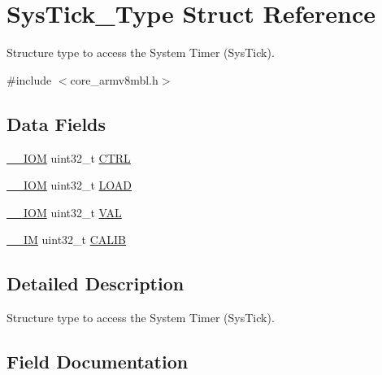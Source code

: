 \hypertarget{struct_sys_tick___type}{}\section{Sys\+Tick\+\_\+\+Type Struct Reference}
\label{struct_sys_tick___type}


Structure type to access the System Timer (Sys\+Tick).  




{\ttfamily \#include $<$core\+\_\+armv8mbl.\+h$>$}

\subsection*{Data Fields}
\begin{DoxyCompactItemize}
\item 
\mbox{\hyperlink{core__cm4_8h_ab6caba5853a60a17e8e04499b52bf691}{\+\_\+\+\_\+\+I\+OM}} uint32\+\_\+t \mbox{\hyperlink{struct_sys_tick___type_ac81efc171e9852a36caeb47122bfec5b}{C\+T\+RL}}
\item 
\mbox{\hyperlink{core__cm4_8h_ab6caba5853a60a17e8e04499b52bf691}{\+\_\+\+\_\+\+I\+OM}} uint32\+\_\+t \mbox{\hyperlink{struct_sys_tick___type_a0c1333686137b7e25a46bd548a5b5bc3}{L\+O\+AD}}
\item 
\mbox{\hyperlink{core__cm4_8h_ab6caba5853a60a17e8e04499b52bf691}{\+\_\+\+\_\+\+I\+OM}} uint32\+\_\+t \mbox{\hyperlink{struct_sys_tick___type_ae7a655a853654127f3dfb7fa32c3f457}{V\+AL}}
\item 
\mbox{\hyperlink{core__cm4_8h_a4cc1649793116d7c2d8afce7a4ffce43}{\+\_\+\+\_\+\+IM}} uint32\+\_\+t \mbox{\hyperlink{struct_sys_tick___type_aedf0dff29a9cacdaa2fb7eec6b116a13}{C\+A\+L\+IB}}
\end{DoxyCompactItemize}


\subsection{Detailed Description}
Structure type to access the System Timer (Sys\+Tick). 

\subsection{Field Documentation}
\mbox{\label{struct_sys_tick___type_aedf0dff29a9cacdaa2fb7eec6b116a13}} 
